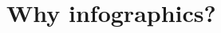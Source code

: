 \documentclass[8pt]{beamer}
\begin{document}
\begin{frame}
\frametitle{\insertsection}
\tableofcontents[hideallsubsections]
\end{frame}





\section{Why infographics?}

\bgroup
{}
\begin{frame}[plain]{}
\begin{center}
\color{white}{\Huge\insertsection}
\end{center}
\end{frame}
\egroup

\end{document}
